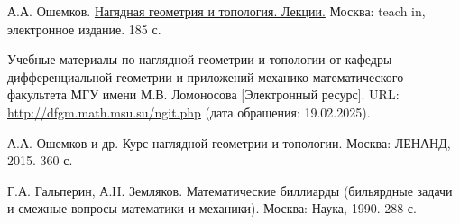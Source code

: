 \begin{thebibliography}{2}
    А.А. Ошемков. \href{https://teach-in.ru/file/synopsis/pdf/visual-geometry-and-topology-oshemkov-M.pdf}{Нагядная геометрия и топология. Лекции.} Москва: teach in, электронное издание. 185 с.
    
    Учебные материалы по наглядной геометрии и топологии от кафедры дифференциальной геометрии и приложений механико-математического факультета МГУ имени М.В. Ломоносова [Электронный ресурс]. URL: \href{http://dfgm.math.msu.su/ngit.php}{http://dfgm.math.msu.su/ngit.php} (дата обращения: 19.02.2025).

    А.А. Ошемков и др. Курс наглядной геометрии и топологии. Москва: ЛЕНАНД, 2015. 360 с.

    Г.А. Гальперин, А.Н. Земляков. Математические биллиарды (бильярдные задачи и смежные вопросы математики и механики). Москва: Наука, 1990. 288 с.

\end{thebibliography}